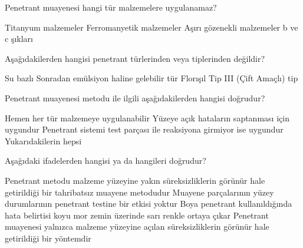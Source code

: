 \begin{question}[subtitle=]
Penetrant muayenesi hangi tür malzemelere uygulanamaz?
	\begin{tasks}
          \task Titanyum malzemeler 
          \task Ferromanyetik malzemeler 
          \task Aşırı gözenekli malzemeler \correct
          \task b ve c şıkları
	\end{tasks}
\end{question}
\begin{solution}
	\correct
\end{solution}

\begin{question}[subtitle=]
Aşağıdakilerden hangisi penetrant türlerinden veya tiplerinden değildir?
	\begin{tasks}
          \task Su bazlı \correct
          \task Sonradan emülsiyon haline gelebilir tür
          \task Florışıl
          \task Tip III (Çift Amaçlı) tip
	\end{tasks}
\end{question}
\begin{solution}
	\correct
\end{solution}

\begin{question}[subtitle=]
	Penetrant muayenesi metodu ile ilgili aşağıdakilerden hangisi doğrudur?
	
	\begin{tasks}
		\task Hemen her tür malzemeye uygulanabilir
		\task Yüzeye açık hataların saptanması için uygundur
		\task Penetrant sistemi test parçası ile reaksiyona girmiyor ise uygundur
		\task Yukarıdakilerin hepsi \correct
	\end{tasks}
\end{question}
\begin{solution}
	\correct
\end{solution}

\begin{question}[subtitle=]
	Aşağıdaki ifadelerden hangisi ya da hangileri doğrudur?
	
	\begin{tasks}
		\task Penetrant metodu malzeme yüzeyine yakın süreksizliklerin görünür hale getirildiği bir tahribatsız muayene metodudur
		\task Muayene parçalarının yüzey durumlarının penetrant testine bir etkisi yoktur
		\task Boya penetrant kullanıldığında hata belirtisi koyu mor zemin üzerinde sarı renkle ortaya çıkar
		\task Penetrant muayenesi yalnızca malzeme yüzeyine açılan süreksizliklerin görünür hale
getirildiği bir yöntemdir \correct
	\end{tasks}
\end{question}
\begin{solution}
	\correct
\end{solution}

